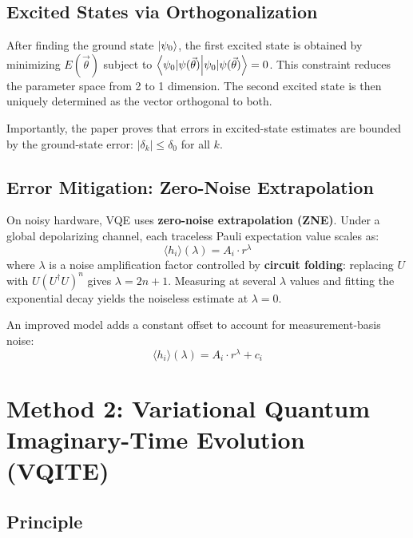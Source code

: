 \documentclass[11pt,a4paper]{article}
\begin{document}
\subsection{Excited States via Orthogonalization}

After finding the ground state $\ket{\psi_0}$, the first excited state is
obtained by minimizing $E(\vec\theta)$ subject to
$\braket{\psi_0|\psi(\vec\theta)} = 0$.  This constraint reduces the
parameter space from 2 to 1 dimension.  The second excited state is then
uniquely determined as the vector orthogonal to both.

Importantly, the paper proves that errors in excited-state estimates are
bounded by the ground-state error:
$|\delta_k| \leq \delta_0$ for all $k$.

\subsection{Error Mitigation: Zero-Noise Extrapolation}

On noisy hardware, VQE uses \textbf{zero-noise extrapolation (ZNE)}.
Under a global depolarizing channel, each traceless Pauli expectation value
scales as:
\begin{equation}
  \langle h_i \rangle(\lambda) = A_i \cdot r^{\lambda}
  \label{eq:zne}
\end{equation}
where $\lambda$ is a noise amplification factor controlled by
\textbf{circuit folding}: replacing $U$ with $U(U^\dagger U)^n$ gives
$\lambda = 2n+1$.  Measuring at several $\lambda$ values and fitting the
exponential decay yields the noiseless estimate at $\lambda = 0$.

An improved model adds a constant offset to account for measurement-basis
noise:
\begin{equation}
  \langle h_i \rangle(\lambda) = A_i \cdot r^{\lambda} + c_i
  \label{eq:zne_improved}
\end{equation}


\section{Method 2: Variational Quantum Imaginary-Time Evolution (VQITE)}
\label{sec:vqite}

\subsection{Principle}
\end{document}
